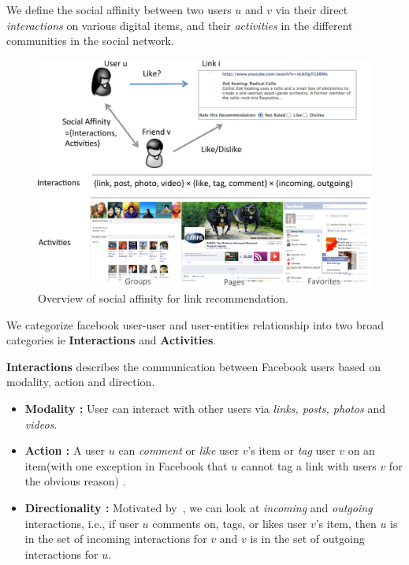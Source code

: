 

We define the social affinity between two users $u$ and $v$ via their direct {\em interactions}
on various digital items, and their {\em activities} in the different communities in the social network. 

\begin{figure}[t!]
\centering
\includegraphics[width=.95\linewidth]{data/overview}
\caption{Overview of social affinity for link recommendation.}
\label{fig:overview}
\end{figure}


We categorize facebook user-user and user-entities relationship into two broad categories ie \textbf{Interactions} and \textbf{Activities}.

{\bf Interactions} describes the communication between Facebook users based on modality, action and direction.
\begin{itemize}
\item \textbf{Modality :}  User can interact with other users via
									 \textit{links, posts, photos} and \textit{videos}.
\item \textbf{Action :}  A user $u$ can \textit{comment} or \textit{like} 
									user $v$'s item or \textit{tag} user $v$ on an 
									item(with one exception in Facebook that $u$ cannot tag a 
									link with users $v$ for the obvious reason) .
\item \textbf{Directionality :} Motivated by~\cite{saez2011high}, we can look
      								at \textit{incoming} and \textit{outgoing} interactions, i.e.,
      								if user $u$ comments on, tags, or likes user $v$'s item,
      								then $u$ is in the set of incoming interactions for $v$
      								and $v$ is in the set of outgoing interactions for $u$.
      								
\end{itemize}								

